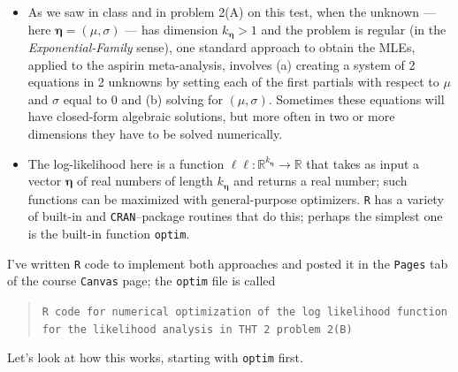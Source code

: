 \documentclass[12pt]{article}
\begin{document}
\begin{itemize}

\item

As we saw in class and in problem 2(A) on this test, when the unknown --- here 
$\bm{ \eta } = ( \mu, \sigma )$ --- has dimension $k_{ \bm{ \eta } } > 1$ and the problem is regular (in the \textit{Exponential-Family} sense), one standard approach to obtain the MLEs, applied to the aspirin meta-analysis, involves (a) creating a system of 2 equations in 2 unknowns by setting each of the first partials with respect to $\mu$ and $\sigma$ equal to 0 and (b) solving for $( \mu, \sigma )$. Sometimes these equations will have closed-form algebraic solutions, but more often in two or more dimensions they have to be solved numerically.

\item

The log-likelihood here is a function $\ell \ell \! \! : \mathbb{ R }^{ k_{ \bm{ \eta }  } } \rightarrow \mathbb{ R }$ that takes as input a vector $\bm{ \eta }$ of real numbers of length $k_{ \bm{ \eta } }$ and returns a real number; such functions can be maximized with general-purpose optimizers. \texttt{R} has a variety of built-in and \texttt{CRAN}--package routines that do this; perhaps the simplest one is the built-in function \texttt{optim}.

\end{itemize}

I've written \texttt{R} code to implement both approaches and posted it in the \texttt{Pages} tab of the course \texttt{Canvas} page; the \texttt{optim} file is called 

\begin{quote}

\texttt{R code for numerical optimization of the log likelihood function} \\ \texttt{for the likelihood analysis in THT 2 problem 2(B)}

\end{quote}

Let's look at how this works, starting with \texttt{optim} first.
\end{document}

